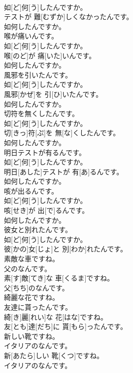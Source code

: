 \documentclass[8pt]{extreport}
\begin{document}
\begin{CJK}{UTF8}{min}
\\	如[ど]何[う]したんですか。 
\\	テストが 難[むずか]しくなかったんです。
\\	如何したんですか。 
\\	喉が痛いんです。	
\\	如[ど]何[う]したんですか。 
\\	喉[のど]が 痛[いた]いんです。
\\	如何したんですか。 
\\	風邪を引いたんです。	
\\	如[ど]何[う]したんですか。 
\\	風邪[かぜ]を 引[ひ]いたんです。
\\	如何したんですか。 
\\	切符を無くしたんです。	
\\	如[ど]何[う]したんですか。 
\\	切[きっ]符[ぷ]を 無[な]くしたんです。
\\	如何したんですか。 
\\	明日テストが有るんです。	
\\	如[ど]何[う]したんですか。 
\\	明日[あした]テストが 有[あ]るんです。
\\	如何したんですか。 
\\	咳が出るんです。	
\\	如[ど]何[う]したんですか。 
\\	咳[せき]が 出[で]るんです。
\\	如何したんですか。 
\\	彼女と別れたんです。	
\\	如[ど]何[う]したんですか。 
\\	彼[かの]女[じょ]と 別[わか]れたんです。
\\	素敵な車ですね。 
\\	父のなんです。	
\\	素[す]敵[てき]な 車[くるま]ですね。 
\\	父[ちち]のなんです。
\\	綺麗な花ですね。 
\\	友達に貰ったんです。	
\\	綺[き]麗[れい]な 花[はな]ですね。 
\\	友[とも]達[だち]に 貰[もら]ったんです。
\\	新しい靴ですね。 
\\	イタリアのなんです。	
\\	新[あたら]しい 靴[くつ]ですね。 
\\	イタリアのなんです。

\end{CJK}
\end{document}
